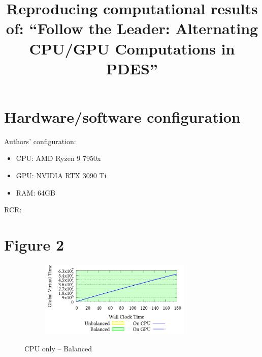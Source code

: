 \documentclass[8pt]{article}
\title{Reproducing computational results of: ``Follow the Leader: Alternating CPU/GPU Computations in PDES''}
\author{}
\date{}
\begin{document}
\maketitle

\section*{Hardware/software configuration}
{\scriptsize
\begin{minipage}[t]{0.45\textwidth}
Authors' configuration:
\begin{itemize}
\item CPU: AMD Ryzen 9 7950x
\item GPU: NVIDIA RTX 3090 Ti
\item RAM: 64GB
\end{itemize}
\end{minipage}
\begin{minipage}[t]{0.45\textwidth}
RCR:
\begin{itemize}

\end{itemize}
\end{minipage}
}
\setcounter{figure}{2}

\section*{Figure 2}

\newcommand{\mysize}{0.75\linewidth}


\renewcommand{\mysize}{0.45\linewidth}

\setcounter{figure}{1}
\renewcommand{\thefigure}{\arabic{figure}a}
\begin{figure}[!h]
\centering
\begin{subfigure}[b]{\mysize}
\centering
\includegraphics[width=0.8\textwidth]{figures_original/balanced/1.processed.pdf}
\renewcommand{\thesubfigure}{Original}
\caption{}
\end{subfigure}
\begin{subfigure}[b]{\mysize}
\centering
{}
\renewcommand{\thesubfigure}{Reproduced}
\caption{}
\end{subfigure}
\caption{CPU only – Balanced}
\end{figure}
\end{document}
